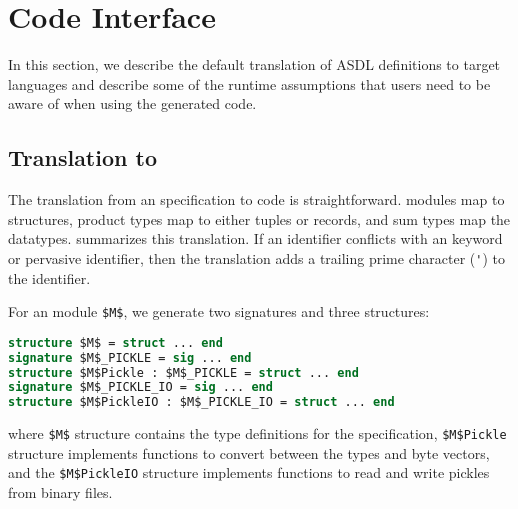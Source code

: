 %
\chapter{Code Interface}
\label{chap:code-interface}

In this section, we describe the default translation of ASDL definitions to target
languages and describe some of the runtime assumptions that users need to be aware of
when using the generated code.

\section{Translation to \sml{}}

The translation from an \asdl{} specification to \sml{} code is straightforward.
\asdl{} modules map to \sml{} structures, \asdl{} product types map to either tuples or records,
and \asdl{} sum types map the \sml{} datatypes.
 summarizes this translation.
If an \asdl{} identifier conflicts with an \sml{} keyword or pervasive identifier, then the translation
adds a trailing prime character (\lstinline[language=SML]!'!) to the identifier.

For an \asdl{} module \lstinline[mathescape=true]@$M$@, we generate two \sml{} signatures
and three \sml{} structures:
\begin{code}\begin{lstlisting}[language=SML,mathescape=true]
structure $M$ = struct ... end
signature $M$_PICKLE = sig ... end
structure $M$Pickle : $M$_PICKLE = struct ... end
signature $M$_PICKLE_IO = sig ... end
structure $M$PickleIO : $M$_PICKLE_IO = struct ... end
\end{lstlisting}\end{code}%
where \lstinline[language=SML,mathescape=true]@$M$@ structure contains the type definitions
for the \asdl{} specification, \lstinline[language=SML,mathescape=true]@$M$Pickle@ structure
implements functions to convert between the types and byte vectors, and the
\lstinline[language=SML,mathescape=true]@$M$PickleIO@ structure implements functions to
read and write pickles from binary files.

